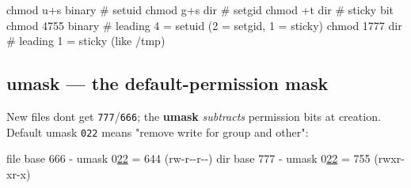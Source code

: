 \documentclass[11pt]{article}
\newenvironment{Shaded}{\begin{snugshade}}{\end{snugshade}}
\newcommand{\AttributeTok}[1]{\textcolor[rgb]{0.16,0.50,0.73}{#1}}
\newcommand{\BuiltInTok}[1]{\textcolor[rgb]{0.50,0.55,0.55}{#1}}
\newcommand{\CommentTok}[1]{\textcolor[rgb]{0.48,0.49,0.49}{#1}}
\newcommand{\DecValTok}[1]{\textcolor[rgb]{0.96,0.45,0.00}{#1}}
\newcommand{\ErrorTok}[1]{\textcolor[rgb]{0.85,0.27,0.33}{\underline{#1}}}
\newcommand{\ExtensionTok}[1]{\textcolor[rgb]{0.00,0.60,1.00}{\textbf{#1}}}
\newcommand{\FunctionTok}[1]{\textcolor[rgb]{0.56,0.27,0.68}{#1}}
\newcommand{\NormalTok}[1]{\textcolor[rgb]{0.81,0.81,0.76}{#1}}
\newcommand{\OperatorTok}[1]{\textcolor[rgb]{0.81,0.81,0.76}{#1}}
\begin{document}

\begin{Shaded}
\end{Shaded}


\begin{Shaded}
\begin{Highlighting}[]
\FunctionTok{chmod}\NormalTok{ u+s binary    }\CommentTok{\# setuid}
\FunctionTok{chmod}\NormalTok{ g+s dir       }\CommentTok{\# setgid}
\FunctionTok{chmod}\NormalTok{ +t dir        }\CommentTok{\# sticky bit}
\FunctionTok{chmod}\NormalTok{ 4755 binary   }\CommentTok{\# leading 4 = setuid (2 = setgid, 1 = sticky)}
\FunctionTok{chmod}\NormalTok{ 1777 dir      }\CommentTok{\# leading 1 = sticky (like /tmp)}
\end{Highlighting}
\end{Shaded}

\subsection{umask --- the default-permission mask}\label{umask--the-default-permission-mask}

New files don\textquotesingle t get \texttt{777}/\texttt{666}; the \textbf{umask} \emph{subtracts} permission bits at creation. Default umask \texttt{022} means "remove write for group and other":


\begin{Shaded}
\begin{Highlighting}[]
\BuiltInTok{file}\NormalTok{ base }\DecValTok{666}  \OperatorTok{{-}}\NormalTok{ umask }\DecValTok{0}\ErrorTok{22}  \OperatorTok{=} \DecValTok{644}\NormalTok{  (rw}\OperatorTok{{-}}\NormalTok{r}\OperatorTok{{-}{-}}\NormalTok{r}\OperatorTok{{-}{-}}\NormalTok{)}
\BuiltInTok{dir}\NormalTok{  base }\DecValTok{777}  \OperatorTok{{-}}\NormalTok{ umask }\DecValTok{0}\ErrorTok{22}  \OperatorTok{=} \DecValTok{755}\NormalTok{  (rwxr}\OperatorTok{{-}}\NormalTok{xr}\OperatorTok{{-}}\NormalTok{x)}
\end{Highlighting}
\end{Shaded}
\end{document}
